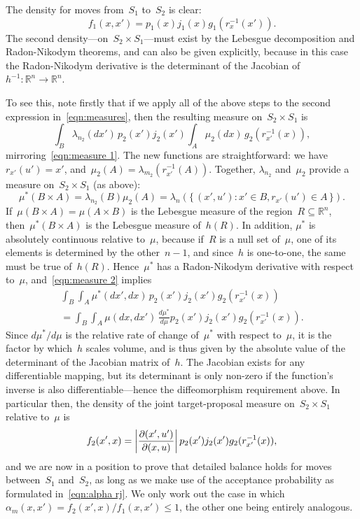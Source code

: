 \documentclass[11pt,a4paper]{article}
\newcommand\mb[1]{\mathbb{#1}}                   %
\DeclarePairedDelimiter\abs{\lvert}{\rvert}      %
\theoremstyle{definition}
\begin{document}
The density for moves from~$S_1$ to~$S_2$ is clear:
\[ f_1(x,x') = p_1(x)j_1(x)g_1(r_x^{-1}(x')). \]
The second density---on~$S_2 \times S_1$---must exist by the Lebesgue
decomposition and Radon-Nikodym theorems, and can also be given explicitly,
because in this case the Radon-Nikodym derivative is the determinant of the
Jacobian of~$h^{-1}\colon \mb{R}^n \to \mb{R}^n$.

To see this, note firstly that if we apply all of the above steps to the second
expression in~\eqref{eqn:measures}, then the resulting measure on~$S_2 \times
S_1$ is
\begin{equation}\label{eqn:measure 2}
  \int_B \lambda_{n_2}(dx')\,p_2(x')j_2(x')
    \int_A \mu_2(dx)\,g_2(r_{x'}^{-1}(x)),
\end{equation}
mirroring~\eqref{eqn:measure 1}. The new functions are straightforward: we have
$r_{x'}(u') = x'$, and~$\mu_2(A) = \lambda_{m_2}(r_{x'}^{-1}(A))$. Together,
$\lambda_{n_2}$ and~$\mu_2$ provide a measure on~$S_2 \times S_1$ (as above):
\[ \mu^*(B \times A) = \lambda_{n_2}(B)\mu_2(A)
  = \lambda_n(\{\, (x',u') : x' \in B, r_{x'}(u') \in A \,\}). \]
If~$\mu(B \times A) = \mu(A \times B)$ is the Lebesgue measure of the region~$R
\subseteq \mb{R}^n$, then~$\mu^*(B \times A)$ is the Lebesgue measure of~$h(R)$.
In addition, $\mu^*$ is absolutely continuous relative to~$\mu$, because if~$R$
is a null set of~$\mu$, one of its elements is determined by the other~$n-1$,
and since~$h$ is one-to-one, the same must be true of~$h(R)$. Hence~$\mu^*$ has
a Radon-Nikodym derivative with respect to~$\mu$, and~\eqref{eqn:measure 2}
implies
\begin{multline*}
  \int_B \int_A \mu^*(dx',dx)\,p_2(x')j_2(x')g_2(r_{x'}^{-1}(x)) \\
    = \int_B \int_A \mu(dx,dx')\,\frac{d\mu^*}{d\mu}
        p_2(x')j_2(x')g_2(r_{x'}^{-1}(x)).
\end{multline*}
Since $d\mu^*/d\mu$ is the relative rate of change of~$\mu^*$ with respect
to~$\mu$, it is the factor by which~$h$ scales volume, and is thus given by the
absolute value of the determinant of the Jacobian matrix of~$h$. The Jacobian
exists for any differentiable mapping, but its determinant is only non-zero if
the function's inverse is also differentiable---hence the diffeomorphism
requirement above. In particular then, the density of the joint target-proposal
measure on~$S_2 \times S_1$ relative to~$\mu$ is
\[ f_2(x',x) = \abs*{\frac{\partial(x',u')}{\partial(x,u)}}\,
    p_2(x')j_2(x')g_2(r_{x'}^{-1}(x)), \]
and we are now in a position to prove that detailed balance holds for moves
between~$S_1$ and~$S_2$, as long as we make use of the acceptance probability as
formulated in~\eqref{eqn:alpha rj}. We only work out the case in
which~$\alpha_m(x,x') = f_2(x',x)/f_1(x,x') \le 1$, the other one being entirely
analogous.
\end{document}
